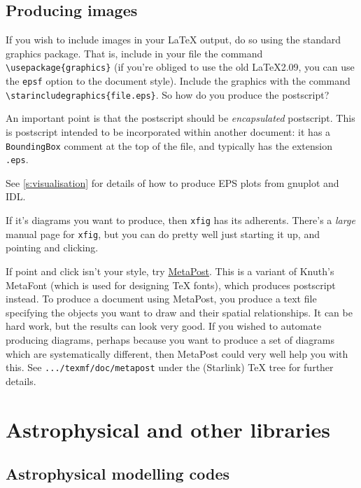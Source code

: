 \documentclass[11pt,oneside,chapters]{starlink}
\begin{document}
\section{Producing images}
\label{s:im}

If you wish to include images in your LaTeX output, do so
using the standard graphics package.  That is, include in
your file the command \texttt{\textbackslash{}usepackage\{graphics\}} (if
you're obliged to use the old LaTeX2.09, you can use the
\texttt{epsf} option to the document style).  Include
the graphics with the command
\texttt{\textbackslash{}starincludegraphics\{file.eps\}}.  So how do you
produce the postscript?

An important point is that the postscript should be
\emph{encapsulated} postscript.  This is postscript intended to be
incorporated within another document: it has a \texttt{BoundingBox}
comment at the top of the file, and typically has the extension
\texttt{.eps}.

See \ref{s:visualisation} for details of how to produce EPS
plots from gnuplot and IDL.

If it's diagrams you want to produce, then \texttt{xfig} has its adherents.
There's a \emph{large} manual page for \texttt{xfig}, but you can do pretty
well just starting it up, and pointing and clicking.

If point and click isn't your style, try
\href{http://cm.bell-labs.com/who/hobby/MetaPost.html}{MetaPost}.
This is a variant of Knuth's MetaFont (which is used for
designing TeX fonts), which produces postscript instead.  To
produce a document using MetaPost, you produce a text file
specifying the objects you want to draw and their spatial
relationships.  It can be hard work, but the results can
look very good.  If you wished to automate producing
diagrams, perhaps because you want to produce a set of
diagrams which are systematically different, then MetaPost
could very well help you with this.  See
\texttt{.../texmf/doc/metapost} under the (Starlink) TeX
tree for further details.

\chapter{Astrophysical and other libraries}
\label{s:astro}

\section{Astrophysical modelling codes}
\label{s:models}
\end{document}
